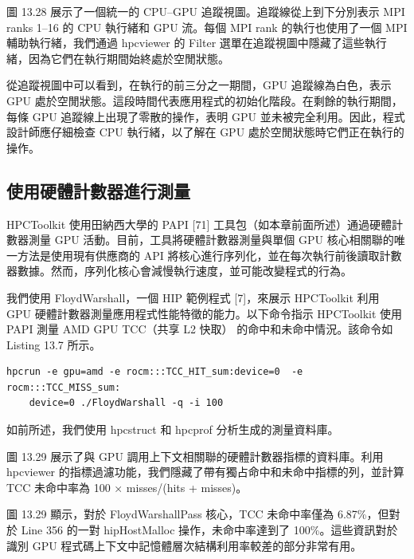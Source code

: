 圖 13.28 展示了一個統一的 CPU–GPU 追蹤視圖。追蹤線從上到下分別表示 MPI ranks 1–16 的 CPU 執行緒和 GPU 流。每個 MPI rank 的執行也使用了一個 MPI 輔助執行緒，我們通過 hpcviewer 的 Filter 選單在追蹤視圖中隱藏了這些執行緒，因為它們在執行期間始終處於空閒狀態。

從追蹤視圖中可以看到，在執行的前三分之一期間，GPU 追蹤線為白色，表示 GPU 處於空閒狀態。這段時間代表應用程式的初始化階段。在剩餘的執行期間，每條 GPU 追蹤線上出現了零散的操作，表明 GPU 並未被完全利用。因此，程式設計師應仔細檢查 CPU 執行緒，以了解在 GPU 處於空閒狀態時它們正在執行的操作。



\subsection{使用硬體計數器進行測量}

HPCToolkit 使用田納西大學的 PAPI [71] 工具包（如本章前面所述）通過硬體計數器測量 GPU 活動。目前，工具將硬體計數器測量與單個 GPU 核心相關聯的唯一方法是使用現有供應商的 API 將核心進行序列化，並在每次執行前後讀取計數器數據。然而，序列化核心會減慢執行速度，並可能改變程式的行為。

我們使用 FloydWarshall，一個 HIP 範例程式 [7]，來展示 HPCToolkit 利用 GPU 硬體計數器測量應用程式性能特徵的能力。以下命令指示 HPCToolkit 使用 PAPI 測量 AMD GPU TCC（共享 L2 快取） 的命中和未命中情況。該命令如 Listing 13.7 所示。

\begin{lstlisting}[caption={Listing 13.7: Command for collecting the TCC miss counter for the FloydWarshall application using HPCToolkit.}]
hpcrun -e gpu=amd -e rocm:::TCC_HIT_sum:device=0  -e rocm:::TCC_MISS_sum:
    device=0 .∕FloydWarshall -q -i 100
\end{lstlisting}

如前所述，我們使用 hpcstruct 和 hpcprof 分析生成的測量資料庫。

圖 13.29 展示了與 GPU 調用上下文相關聯的硬體計數器指標的資料庫。利用 hpcviewer 的指標過濾功能，我們隱藏了帶有獨占命中和未命中指標的列，並計算 TCC 未命中率為 100 × misses/(hits + misses)。

圖 13.29 顯示，對於 FloydWarshallPass 核心，TCC 未命中率僅為 6.87\%，但對於 Line 356 的一對 hipHostMalloc 操作，未命中率達到了 100\%。這些資訊對於識別 GPU 程式碼上下文中記憶體層次結構利用率較差的部分非常有用。

